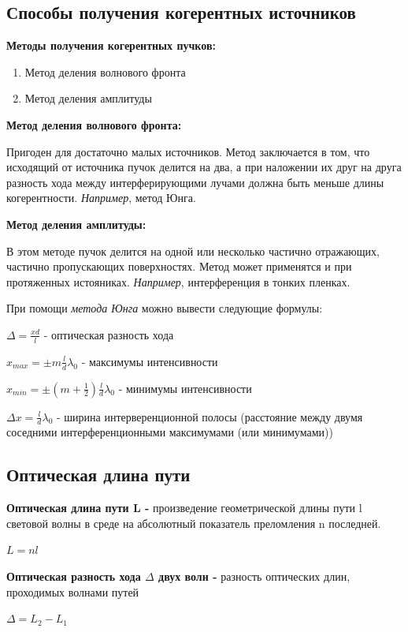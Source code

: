 \documentclass[12pt]{report}
\begin{document}
\subsection{Способы получения когерентных источников}
\textbf{Методы получения когерентных пучков:}
\begin{enumerate}
    \item Метод деления волнового фронта
    \item Метод деления амплитуды
\end{enumerate}
\textbf{Метод деления волнового фронта:}\par
Пригоден для достаточно малых источников. Метод заключается в том, что исходящий от источника пучок делится на два, а при наложении их друг на друга разность хода между интерферирующими лучами должна быть меньше длины когерентности. \textit{Например}, метод Юнга.\par
\textbf{Метод деления амплитуды:}\par
В этом методе пучок делится на одной или несколько частично отражающих, частично пропускающих поверхностях. Метод может применятся и при протяженных истояниках. \textit{Например}, интерференция в тонких пленках.\par
При помощи \textit{метода Юнга} можно вывести следующие формулы:\par
$\Delta = \frac{xd}{l}$ - оптическая разность хода\par
$x_{max} = \pm m \frac{l}{d} \lambda_0$ - максимумы интенсивности\par
$x_{min} = \pm (m + \frac{1}{2}) \frac{l}{d} \lambda_0$ - минимумы интенсивности\par
$\Delta x = \frac{l}{d} \lambda_0$ - ширина интерверенционной полосы (расстояние между двумя соседними интерференционными максимумами (или минимумами))\par

\subsection{Оптическая длина пути}
\textbf{Оптическая длина пути L -} произведение геометрической длины пути l световой волны в среде на абсолютный показатель преломления n последней.\par
$L = nl$\par
\textbf{Оптическая разность хода $\Delta$ двух волн -} разность оптических длин, проходимых волнами путей\par
$\Delta = L_{2} - L_{1}$
\end{document}
